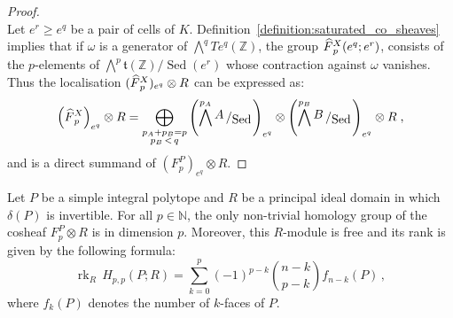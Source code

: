 \documentclass[AHL,Unicode,longabstracts,published]{cedram}
\newcommand{\bigslant}[2]{{\raisebox{.2em}{$#1$}\left/\raisebox{-.2em}{$#2$}\right.}}
\newcommand{\Z}{\mathbb{Z}}
\newcommand{\N}{\mathbb{N}}
\renewcommand{\t}{\mathfrak{t}}
\DeclareMathOperator{\Sed}{Sed}
\DeclareMathOperator{\rk}{rk}
\newcommand{\Fbar}{\hat{F}}
\newcommand{\smallslant}[2]{{#1}/{#2}}
\let\oldhat\hat
\renewcommand*{\hat}[1]{\mathchoice{\widehat{#1}}{\widehat{#1}}{\oldhat{#1}}{\oldhat{#1}}}
\begin{document}
\begin{proof}
\begin{equation*}
\end{equation*}
Let $e^r\geq e^q$ be a pair of cells of $K$. Definition~\ref{definition:saturated_co_sheaves} implies that if $\omega$ is a generator of $\bigwedge^qTe^q(\Z)$, the group $\Fbar^{X}_p(e^q;e^r)$, consists of the $p$-elements of $\bigwedge^p\smallslant{\t(\Z)}{\Sed(e^r)}$ whose contraction against $\omega$ vanishes. Thus the localisation $(\Fbar^{X}_p)_{e^q}\otimes R$ can be expressed as:
\begin{equation*}
\left(\Fbar^{X}_p\right)_{e^q}\otimes R=\bigoplus_{\substack{p_A+p_B=p \\ p_B\,<\,q}}\left(\bigwedge^{p_A}\bigslant{A}{\Sed}\right)_{e^q}\otimes \left(\bigwedge^{p_B}\bigslant{B}{\Sed}\right)_{e^q}\otimes R\;,
\end{equation*}
and is a direct summand of $(F^{P}_p)_{e^q}\otimes R$.
\end{proof}

\begin{prop}
Let $P$ be a simple integral polytope and $R$ be a principal ideal domain in which $\delta(P)$ is invertible. For all $p\in\N$, the only non-trivial homology group of the cosheaf $F^{P}_p\otimes R$ is in dimension $p$. Moreover, this $R$-module is free and its rank is given by the following formula:
\begin{equation*}
\rk_R\, H_{p,p}(P;R) = \sum_{k=0}^p(-1)^{p-k} \binom{n-k}{p-k}f_{n-k}(P)\,,
\end{equation*}
where $f_k(P)$ denotes the number of $k$-faces of $P$.
\end{prop}
\end{document}
